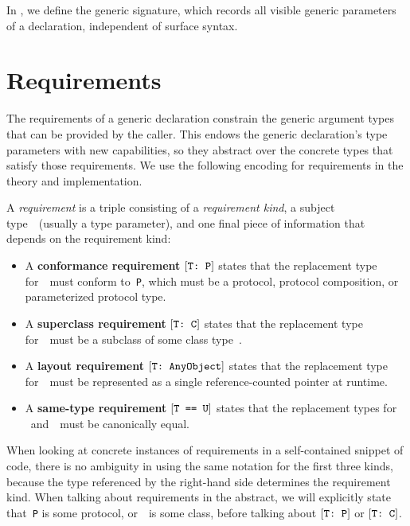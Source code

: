 \documentclass[../generics]{subfiles}
\begin{document}
In , we define the generic signature, which records all visible generic parameters of a declaration, independent of surface syntax.

\section{Requirements}\label{requirements}

The requirements of a generic declaration constrain the generic argument types that can be provided by the caller. This endows the generic declaration's type parameters with new capabilities, so they abstract over the concrete types that satisfy those requirements. We use the following encoding for requirements in the theory and implementation.

\begin{definition}\label{requirement def}
A \emph{requirement} is a triple consisting of a \emph{requirement kind}, a subject type~\tT\ (usually a type parameter), and one final piece of information that depends on the requirement kind:
\begin{itemize}
\item A \textbf{conformance requirement} $[\texttt{T:~P}]$ states that the replacement type for~\tT\ must conform to~\texttt{P}, which must be a protocol, protocol composition, or parameterized protocol type.
\item A \textbf{superclass requirement} $[\texttt{T:~C}]$ states that the replacement type for~\tT\ must be a subclass of some class type~\tC.
\item A \textbf{layout requirement} $[\texttt{T:~AnyObject}]$ states that the replacement type for~\tT\ must be represented as a single reference-counted pointer at runtime.
\item A \textbf{same-type requirement} $[\texttt{T == U}]$ states that the replacement types for \tT~and~\tU\ must be canonically equal.
\end{itemize}
\end{definition}

When looking at concrete instances of requirements in a self-contained snippet of code, there is no ambiguity in using the same notation for the first three kinds, because the type referenced by the right-hand side determines the requirement kind. When talking about requirements in the abstract, we will explicitly state that~\texttt{P} is some protocol, or~\tC\ is some class, before talking about $[\texttt{T:~P}]$ or $[\texttt{T:~C}]$.
\end{document}
